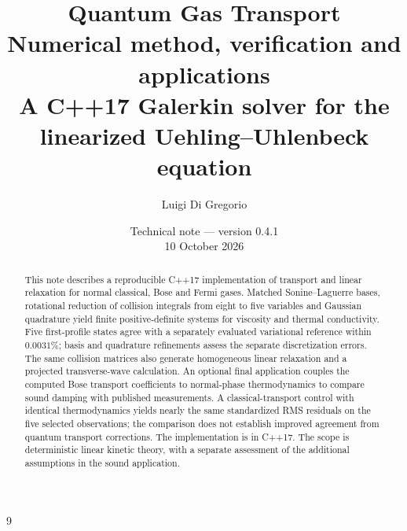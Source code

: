 \documentclass[11pt,a4paper]{article}
\title{\textbf{Quantum Gas Transport}\\[.4em]
\large Numerical method, verification and applications\\[.3em]
\normalsize A C++17 Galerkin solver for the linearized Uehling--Uhlenbeck equation}
\author{Luigi Di Gregorio}
\date{Technical note --- version 0.4.1\\10 October 2026}
\begin{document}
\maketitle
\begin{abstract}
This note describes a reproducible C++17 implementation of transport and
linear relaxation for normal classical, Bose and Fermi gases. Matched
Sonine--Laguerre bases, rotational reduction of collision integrals from eight
to five variables and Gaussian quadrature yield finite positive-definite
systems for viscosity and thermal conductivity. Five first-profile states
agree with a separately evaluated variational reference within $0.0031\%$;
basis and quadrature refinements assess the separate discretization errors.
The same collision matrices also generate homogeneous linear relaxation and
a projected transverse-wave calculation. An optional final application couples
the computed Bose transport coefficients to normal-phase thermodynamics to
compare sound damping with published measurements. A classical-transport control
with identical thermodynamics yields nearly the same standardized RMS residuals
on the five selected observations; the comparison does not establish improved
agreement from quantum transport corrections. The implementation is in
C++17. The scope is deterministic linear kinetic theory, with a separate
assessment of the additional assumptions in the sound application.
\end{abstract}
{\small\tableofcontents}
\clearpage

\par\bigskip

\par\bigskip

\par\bigskip
\begin{thebibliography}{9}

\end{thebibliography}
\end{document}
